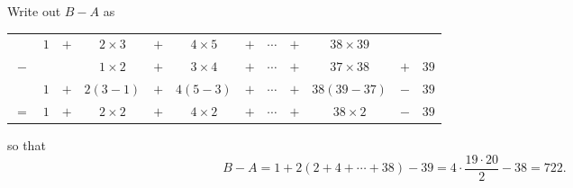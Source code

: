 Write out $B-A$ as
\begin{center}
	\begin{tabular}{cccccccccccc}
		& $1$ & $+$ & $2\times3$ & $+$ & $4\times5$ & $+$ & $\cdots$ & $+$ & $38\times39$ & & \\
		$-$ & & & $1\times2$ & $+$ & $3\times4$ & $+$ & $\cdots$ & $+$ & $37\times38$ & $+$ & $39$ \\\hline
		& $1$ & $+$ & $2\left(3-1\right)$ & $+$ & $4\left(5-3\right)$ & $+$ & $\cdots$ & $+$ & $38\left(39-37\right)$ & $-$ & $39$ \\
		$=$ & $1$ & $+$ & $2\times2$ & $+$ & $4\times2$ & $+$ & $\cdots$ & $+$ & $38\times2$ & $-$ & $39$
	\end{tabular}
\end{center}
so that \[B-A=1+2\left(2+4+\cdots+38\right)-39=4\cdot\frac{19\cdot20}{2}-38=\boxed{722}.\]